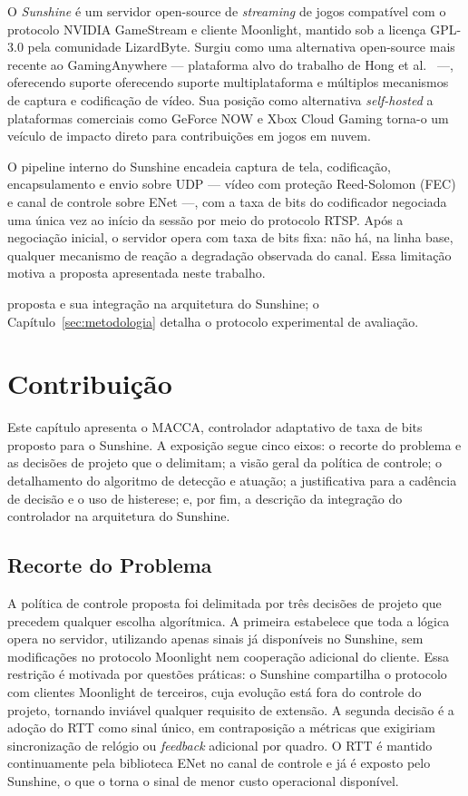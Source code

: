 \documentclass[conference]{IEEEtran}
\begin{document}
O \emph{Sunshine} é um servidor open-source de \emph{streaming}
de jogos compatível com o protocolo NVIDIA GameStream e cliente
Moonlight, mantido sob a licença GPL-3.0 pela comunidade
LizardByte. Surgiu como uma alternativa open-source mais recente ao GamingAnywhere — plataforma alvo do trabalho de Hong et al.~\cite{hong2015} —, oferecendo suporte oferecendo suporte multiplataforma e múltiplos mecanismos de captura e codificação de vídeo.
Sua posição como alternativa \emph{self-hosted} a plataformas
comerciais como GeForce NOW e Xbox Cloud Gaming torna-o um
veículo de impacto direto para contribuições em jogos em nuvem.

O pipeline interno do Sunshine encadeia captura de tela,
codificação, encapsulamento e envio sobre UDP — vídeo com
proteção Reed-Solomon (FEC) e canal de controle sobre ENet —,
com a taxa de bits do codificador negociada uma única vez ao
início da sessão por meio do protocolo RTSP. Após a negociação
inicial, o servidor opera com taxa de bits fixa: não há, na
linha base, qualquer mecanismo de reação a degradação observada
do canal. Essa limitação motiva a proposta apresentada neste trabalho.

proposta e sua integração na arquitetura do Sunshine; o
Capítulo~\ref{sec:metodologia} detalha o protocolo experimental
de avaliação.


\section{Contribuição}\label{sec:contribuicao}

Este capítulo apresenta o MACCA, controlador
adaptativo de taxa de bits proposto para o Sunshine. A
exposição segue cinco eixos: o recorte do problema e as
decisões de projeto que o delimitam; a visão geral da política
de controle; o detalhamento do algoritmo de detecção e atuação;
a justificativa para a cadência de decisão e o uso de
histerese; e, por fim, a descrição da integração do controlador
na arquitetura do Sunshine.

\subsection{Recorte do Problema}

A política de controle proposta foi delimitada por três decisões de projeto que precedem qualquer escolha algorítmica. A primeira estabelece que toda a lógica opera no servidor, utilizando apenas sinais já disponíveis no Sunshine, sem modificações no protocolo Moonlight nem cooperação adicional do cliente. Essa restrição é motivada por questões práticas: o Sunshine compartilha o protocolo com clientes Moonlight de terceiros, cuja evolução está fora do controle do projeto, tornando inviável qualquer requisito de extensão. A segunda decisão é a adoção do RTT como sinal único, em contraposição a métricas que exigiriam sincronização de relógio ou \emph{feedback} adicional por quadro. O RTT é mantido continuamente pela biblioteca ENet no canal de controle e já é exposto pelo Sunshine, o que o torna o sinal de menor custo operacional disponível.
\end{document}
